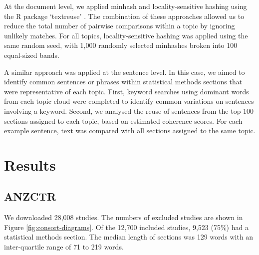 \documentclass[12pt]{article}
\begin{document}
At the document level, we applied minhash and locality-sensitive hashing using the R package `textreuse' \citep{textreuseR}. The combination of these approaches 
allowed us to reduce the total number of pairwise comparisons within a topic by ignoring unlikely matches. For all topics, locality-sensitive hashing was applied using the same random seed, 
with 1,000 randomly selected minhashes broken into 100 equal-sized bands. 

A similar approach was applied at the sentence level. In this case, we aimed to identify common sentences or phrases within statistical methods sections that were representative of each topic. 
First, keyword searches using dominant words from each topic cloud were completed to identify common variations on sentences involving a keyword. Second, we analysed the reuse of sentences from the top 100 sections assigned to each topic, 
based on estimated coherence scores. For each example sentence, text was compared with all sections assigned to the same topic. 

\clearpage

\section{Results}\label{results}

\subsection{ANZCTR}

We downloaded 28,008 studies. The numbers of excluded studies are shown
in Figure \ref{fig:consort-diagrams}. Of the 12,700 included studies,
9,523 (75\%) had a statistical methods section. The median length of
sections was 129 words with an inter-quartile range of 71 to 219 words.
\end{document}
